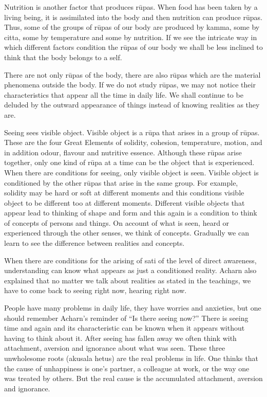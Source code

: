 Nutrition is another factor that produces rūpas. When food has been
taken by a living being, it is assimilated into the body and then
nutrition can produce rūpas. Thus, some of the groups of rūpas of our
body are produced by kamma, some by citta, some by temperature and some
by nutrition. If we see the intricate way in which different factors
condition the rūpas of our body we shall be less inclined to think that
the body belongs to a self.

There are not only rūpas of the body, there are also rūpas which are the
material phenomena outside the body. If we do not study rūpas, we may
not notice their characteristics that appear all the time in daily life.
We shall continue to be deluded by the outward appearance of things
instead of knowing realities as they are.

Seeing sees visible object. Visible object is a rūpa that arises in a
group of rūpas. These are the four Great Elements of solidity, cohesion,
temperature, motion, and in addition odour, flavour and nutritive
essence. Although these rūpas arise together, only one kind of rūpa at a
time can be the object that is experienced. When there are conditions
for seeing, only visible object is seen. Visible object is conditioned
by the other rūpas that arise in the same group. For example, solidity
may be hard or soft at different moments and this conditions visible
object to be different too at different moments. Different visible
objects that appear lead to thinking of shape and form and this again is
a condition to think of concepts of persons and things. On account of
what is seen, heard or experienced through the other senses, we think of
concepts. Gradually we can learn to see the difference between realities
and concepts.

When there are conditions for the arising of sati of the level of direct
awareness, understanding can know what appears as just a conditioned
reality. Acharn also explained that no matter we talk about realities as
stated in the teachings, we have to come back to seeing right now,
hearing right now.

People have many problems in daily life, they have worries and
anxieties, but one should remember Acharn's reminder of ``Is there
seeing now?'' There is seeing time and again and its characteristic can
be known when it appears without having to think about it. After seeing
has fallen away we often think with attachment, aversion and ignorance
about what was seen. These three unwholesome roots (akusala hetus) are
the real problems in life. One thinks that the cause of unhappiness is
one's partner, a colleague at work, or the way one was treated by
others. But the real cause is the accumulated attachment, aversion and
ignorance.


